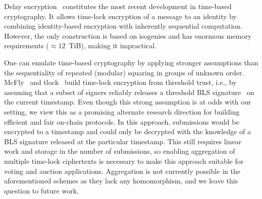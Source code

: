 Delay encryption~\cite{EC:BurDeF21} constitutes the most recent development in time-based cryptography. It allows time-lock encryption of a message to an identity by combining identity-based encryption with inherently sequential computation. However, the only construction is based on isogenies and has enormous memory requirements ($\approx 12$\ TiB), making it impractical.

One can emulate time-based cryptography by applying stronger assumptions than the sequentiality of repeated (modular) squaring in groups of unknown order. McFly~\cite{FC:DHMW23} and tlock~\cite{EPRINT:GaiMelRom23} build time-lock encryption from threshold trust, i.e., by assuming that a subset of signers reliably releases a threshold BLS signature~\cite{AC:BonLynSha01} on the current timestamp. Even though this strong assumption is at odds with our setting, we view this as a promising alternate research direction for building efficient and fair on-chain protocols. In this approach, submissions would be encrypted to a timestamp and could only be decrypted with the knowledge of a BLS signature released at the particular timestamp. This still requires linear work and storage in the number of submissions, so enabling aggregation of multiple time-lock ciphertexts is necessary to make this approach suitable for voting and auction applications. Aggregation is not currently possible in the aforementioned schemes as they lack any homomorphism, and we leave this question to future work. 